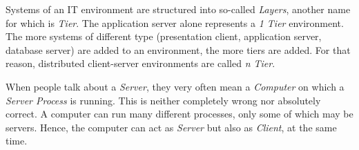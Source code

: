 Systems of an IT environment are structured into so-called \emph{Layers},
another name for which is \emph{Tier}. The application server alone represents
a \emph{1 Tier} environment. The more systems of different type (presentation
client, application server, database server) are added to an environment, the
more tiers are added. For that reason, distributed client-server environments
are called \emph{n Tier}.

When people talk about a \emph{Server}, they very often mean a \emph{Computer}
on which a \emph{Server Process} is running. This is neither completely wrong nor
absolutely correct. A computer can run many different processes, only some of
which may be servers. Hence, the computer can act as \emph{Server} but also as
\emph{Client}, at the same time.
